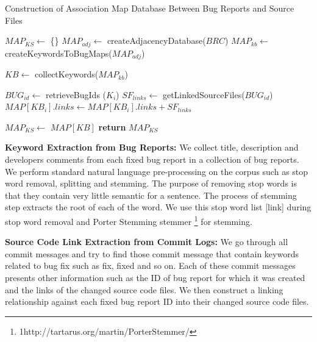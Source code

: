 \documentclass[conference]{IEEEtran}
\begin{document}
\begin{algorithm}[!t]
	\caption{Construction of Association Map Database Between Bug Reports and Source Files}
	\label{map}
	\begin{algorithmic}[1]
		\State $MAP_{KS} \gets$ \{\}
		\State $MAP_{adj} \gets$ createAdjacencyDatabase($BRC$)
		\State $MAP_{kb} \gets$ createKeywordsToBugMaps($MAP_{adj}$)
		
		\State $KB \gets$ collectKeywords($MAP_{kb}$)
		
		\State $BUG_{id} \gets$ retrieveBugIds ($K_i$)
		\State $SF_{links} \gets$ getLinkedSourceFiles($BUG_{id}$)
		\State $MAP[KB_i].links \gets MAP[KB_{i}].links + SF_{links}$
		\EndFor
		\EndFor
		
		\State $MAP_{KS} \gets$ $MAP[KB]$ 
		\State \textbf{return} $MAP_{KS}$
		\EndProcedure
	\end{algorithmic}
\end{algorithm}



\textbf{Keyword Extraction from Bug Reports:} We collect title, description and developers comments from each fixed bug report in a collection of bug reports. We perform standard natural language pre-processing on the corpus such as stop word removal, splitting and stemming. The purpose of removing stop words is that they contain very little semantic for a sentence. The process of stemming step extracts the root of each of the word. We use this stop word list [link] during stop word removal and Porter Stemming stemmer \footnote{{1}http://tartarus.org/martin/PorterStemmer/} for stemming. 



\textbf{Source Code Link Extraction from Commit Logs:}
We go through all commit messages and try to find those commit message that contain keywords related to bug fix such as fix, fixed and so on. Each of these commit messages presents other information such as the ID of bug report for which it was created and the links of the changed source code files. We then construct a linking relationship against each fixed bug report ID into their changed source code files.
\end{document}
